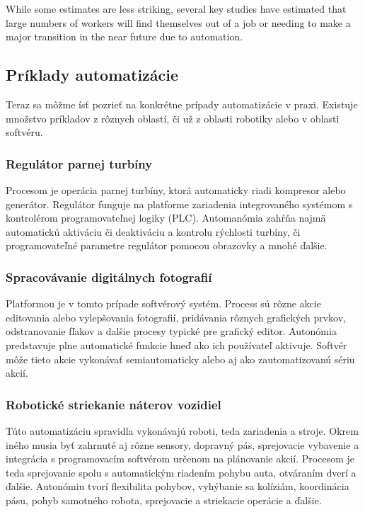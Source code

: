 \documentclass[twoside,slovak, a4paper]{article}
\begin{document}
While some estimates are less striking, several key studies have estimated that large numbers of workers will find themselves out of a job or needing to make a major transition in the near future due to automation.

\subsection{Príklady automatizácie}

Teraz sa môžme ísť pozrieť na konkrétne prípady automatizácie v praxi. Existuje množstvo príkladov z rôznych oblastí, či už z oblasti robotiky alebo v oblasti softvéru.

\subsubsection*{Regulátor parnej turbíny}

Procesom je operácia parnej turbíny, ktorá automaticky riadi kompresor alebo generátor. Regulátor funguje na platforme zariadenia integrovaného systémom s kontrolérom programovateľnej logiky (PLC). Automanómia zahŕňa najmä automatickú aktiváciu či deaktiváciu a kontrolu rýchlosti turbíny, či programovateľné parametre regulátor pomocou obrazovky a mnohé ďalšie.\cite{Nof2009}

\subsubsection*{Spracovávanie digitálnych fotografií}

Platformou je v tomto prípade  softvérový systém. Process sú rôzne akcie editovania alebo vylepšovania fotografií, pridávania rôznych grafických prvkov, odstranovanie fľakov a dalšie procesy typické pre grafický editor. Autonómia predstavuje plne automatické funkcie hneď ako ich používateľ aktivuje. Softvér môže tieto akcie vykonávať semiautomaticky alebo aj ako zautomatizovanú sériu akcií.\cite{Nof2009}


\subsubsection*{Robotické striekanie náterov vozidiel}

Túto automatizáciu spravidla vykonávajú roboti, teda zariadenia a stroje. Okrem iného musia byť zahrnuté aj rôzne sensory, dopravný pás, sprejovacie vybavenie a integrácia s programovacím softvérom určenom na plánovanie akcií. Procesom je teda sprejovanie spolu s automatickým riadením pohybu auta, otváraním dverí a ďalšie. Autonómiu tvorí flexibilita pohybov, vyhýbanie sa kolíziám, koordinácia pásu, pohyb samotného robota, sprejovacie a striekacie operácie a ďalšie.
\end{document}
